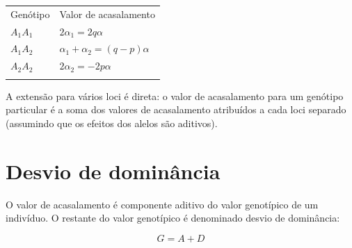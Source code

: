 \documentclass[portuges,]{tufte-handout}
\begin{document}
\begin{longtable}[c]{@{}ll@{}}
\toprule\addlinespace
\begin{minipage}[b]{0.16\columnwidth}\raggedright
Genótipo
\end{minipage} & \begin{minipage}[b]{0.48\columnwidth}\raggedright
Valor de acasalamento
\end{minipage}
\\\addlinespace
\midrule\endhead
\begin{minipage}[t]{0.16\columnwidth}\raggedright
\(A_1\)\(A_1\)
\end{minipage} & \begin{minipage}[t]{0.48\columnwidth}\raggedright
\(2\alpha_1 = 2q\alpha\)
\end{minipage}
\\\addlinespace
\begin{minipage}[t]{0.16\columnwidth}\raggedright
\(A_1\)\(A_2\)
\end{minipage} & \begin{minipage}[t]{0.48\columnwidth}\raggedright
\(\alpha_1 + \alpha_2 = (q-p)\alpha\)
\end{minipage}
\\\addlinespace
\begin{minipage}[t]{0.16\columnwidth}\raggedright
\(A_2\)\(A_2\)
\end{minipage} & \begin{minipage}[t]{0.48\columnwidth}\raggedright
\(2\alpha_2 = -2p\alpha\)
\end{minipage}
\\\addlinespace
\bottomrule
\end{longtable}

A extensão para vários loci é direta: o valor de acasalamento para um
genótipo particular é a soma dos valores de acasalamento atribuídos a
cada loci separado (assumindo que os efeitos dos alelos são aditivos).

\section{Desvio de dominância}\label{desvio-de-dominuxe2ncia}

O valor de acasalamento é componente aditivo do valor genotípico de um
indivíduo. O restante do valor genotípico é denominado desvio de
dominância:

\[
G = A + D
\]
\end{document}
